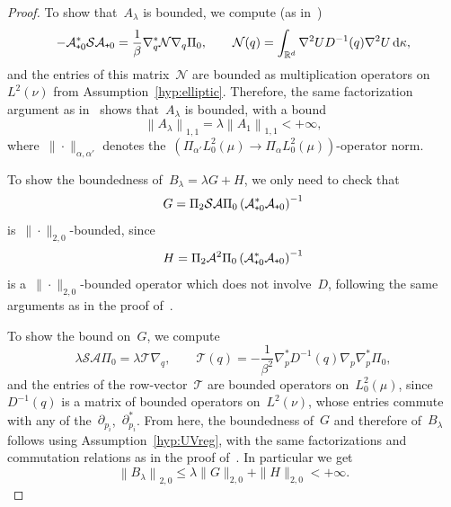 \documentclass[10pt]{article}
\renewcommand{\d}{\mathrm{d}}
\newcommand{\R}{\mathbb{R}}
\newcommand{\cLham}{\mathcal A}
\newcommand{\cLou}{\mathcal S}
\newcommand{\wLmuz}{L^2_0(\mu)}
\newcommand{\subplus}{\textnormal{\texttt{+}}}
\newcommand{\1}{\mathbbm 1}
\begin{document}
\begin{proof}
    To show that~$A_\lambda$ is bounded, we compute (as in~\cite{BFLS22})
    \begin{equation}
        -\cLham_{\subplus 0}^*\cLou\cLham_{\subplus 0} = \frac1\beta \nabla_q^* \mathcal N\nabla_q\Pi_0,\qquad \mathcal N(q) = \int_{\R^d}\nabla^2 U D^{-1}(q)\nabla^2 U\,\d \kappa,
    \end{equation}
    and the entries of this matrix~$\mathcal N$ are bounded as multiplication operators on~$L^2(\nu)$ from Assumption~\ref{hyp:elliptic}. Therefore, the same factorization argument as in~\cite[Theorem 3.3]{BFLS22} shows that~$A_\lambda$ is bounded, with a bound
    \begin{equation}
        \label{eq:Aop_bound}
        \left\|A_\lambda\right\|_{1,1}= \lambda\left\|A_1\right\|_{1,1} < +\infty,
    \end{equation}
    where~$\|\cdot\|_{\alpha,\alpha'}$ denotes the~$\left(\Pi_{\alpha'}\wLmuz\to\Pi_\alpha\wLmuz\right)$-operator norm.

    To show the boundedness of~$B_\lambda=\lambda G+H$, we only need to check that
    \begin{equation}
        \label{eq:Gop}
        G = \Pi_2\cLou\cLham\Pi_0\left(\cLham_{\subplus 0}^*\cLham_{\subplus 0}\right)^{-1}
    \end{equation} is~$\|\cdot\|_{2,0}$-bounded, since
    \begin{equation}
        \label{eq:Hop}
        H = \Pi_2\cLham^2\Pi_0\left(\cLham_{\subplus 0}^*\cLham_{\subplus 0}\right)^{-1}
    \end{equation}
    is a~$\|\cdot\|_{2,0}$-bounded operator which does not involve~$D$, following the same arguments as in the proof of~\cite[Theorem 3.3]{BFLS22}.

    To show the bound on~$G$, we compute
    \begin{equation}
        \lambda\cLou\cLham\Pi_0 = \lambda\mathscr{T}\nabla_q,\qquad \mathscr{T}(q)=-\frac{1}{\beta^2}\nabla_p^*D^{-1}(q)\nabla_p\nabla_p^*\Pi_0,
    \end{equation}
    and the entries of the row-vector~$\mathscr{T}$ are bounded operators on~$\wLmuz$, since~$D^{-1}(q)$ is a matrix of bounded operators on~$L^2(\nu)$, whose entries commute with any of the~$\partial_{p_i}$,~$\partial_{p_i}^*$.
    From here, the boundedness of~$G$ and therefore of~$B_\lambda$ follows using Assumption~\ref{hyp:UVreg}, with the same factorizations and commutation relations as in the proof of~\cite[Theorem 3.3]{BFLS22}.
    In particular we get
    \begin{equation}
        \label{eq:Bop_bound}
        \left\|B_\lambda\right\|_{2,0} \leq \lambda \|G\|_{2,0} + \|H\|_{2,0} < +\infty.
    \end{equation}


\end{proof}
\end{document}

